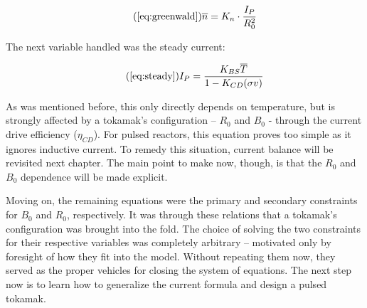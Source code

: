 \begin{equation}
	\tag{\ref{eq:greenwald}}
	\overline n = K_n \cdot \frac{I_P}{R_0^2}
\end{equation}

The next variable handled was the steady current:

\begin{equation}
	\tag{\ref{eq:steady}}
	I_P = \frac{K_{BS} \overline T}{1 - K_{CD} ( \sigma v ) }
\end{equation}

As was mentioned before, this only directly depends on temperature, but is strongly affected by a tokamak's configuration -- $R_0$ and $B_0$ - through the current drive efficiency ($\eta_{CD}$). For pulsed reactors, this equation proves too simple as it ignores inductive current. To remedy this situation, current balance will be revisited next chapter. The main point to make now, though, is that the $R_0$ and $B_0$ dependence will be made explicit.

Moving on, the remaining equations were the primary and secondary constraints for $B_0$ and $R_0$, respectively. It was through these relations that a tokamak's configuration was brought into the fold. The choice of solving the two constraints for their respective variables was completely arbitrary -- motivated only by foresight of how they fit into the model. Without repeating them now, they served as the proper vehicles for closing the system of equations. The next step now is to learn how to generalize the current formula and design a pulsed tokamak.

%
